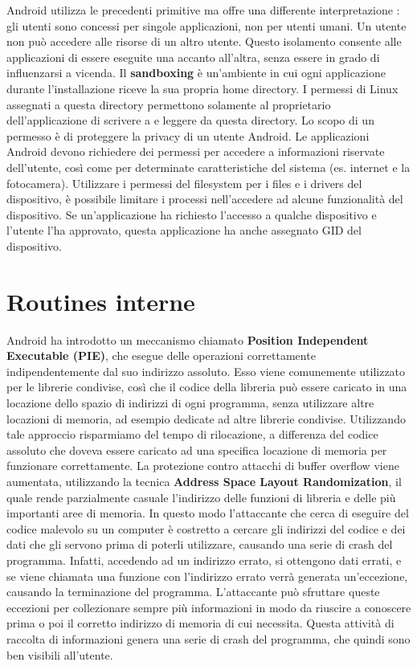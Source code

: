 \documentclass[12pt]{report}
\begin{document}
Android utilizza le precedenti primitive ma offre una differente interpretazione : gli utenti sono concessi per singole applicazioni, non per utenti umani. Un utente non può accedere alle risorse di un altro utente. Questo isolamento consente alle applicazioni di essere eseguite una accanto all'altra, senza essere in grado di influenzarsi a vicenda. Il \textbf{sandboxing} è un'ambiente in cui ogni applicazione durante l'installazione riceve la sua propria home directory. I permessi di Linux assegnati a questa directory permettono solamente al proprietario dell'applicazione di scrivere a e leggere da questa directory. Lo scopo di un permesso è di proteggere la privacy di un utente Android. Le applicazioni Android devono richiedere dei permessi per accedere a informazioni riservate dell'utente, così come per determinate caratteristiche del sistema (es. internet e la fotocamera). Utilizzare i permessi del filesystem per i files e i drivers del dispositivo, è possibile limitare i processi nell'accedere ad alcune funzionalità del dispositivo. Se un'applicazione ha richiesto l'accesso a qualche dispositivo e l'utente l'ha approvato, questa applicazione ha anche assegnato GID del dispositivo.
\section{Routines interne}
Android ha introdotto un meccanismo chiamato \textbf{Position Independent Executable (PIE)}, che esegue delle operazioni correttamente indipendentemente dal suo indirizzo assoluto. Esso viene comunemente utilizzato per le librerie condivise, così che il codice della libreria può essere caricato in una locazione dello spazio di indirizzi di ogni programma, senza utilizzare altre locazioni di memoria, ad esempio dedicate ad altre librerie condivise. Utilizzando tale approccio risparmiamo del tempo di rilocazione, a differenza del codice assoluto che doveva essere caricato ad una specifica locazione di memoria per funzionare correttamente. La protezione contro attacchi di buffer overflow viene aumentata, utilizzando la tecnica \textbf{Address Space Layout Randomization}, il quale rende parzialmente casuale l'indirizzo delle funzioni di libreria e delle più importanti aree di memoria. In questo modo l'attaccante che cerca di eseguire del codice malevolo su un computer è costretto a cercare gli indirizzi del codice e dei dati che gli servono prima di poterli utilizzare, causando una serie di crash del programma. Infatti, accedendo ad un indirizzo errato, si ottengono dati errati, e se viene chiamata una funzione con l'indirizzo errato verrà generata un'eccezione, causando la terminazione del programma. L'attaccante può sfruttare queste eccezioni per collezionare sempre più informazioni in modo da riuscire a conoscere prima o poi il corretto indirizzo di memoria di cui necessita. Questa attività di raccolta di informazioni genera una serie di crash del programma, che quindi sono ben visibili all'utente. 
\end{document}
